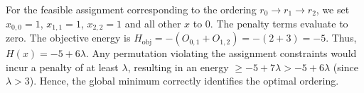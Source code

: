 \documentclass[12pt]{article}
\begin{document}
For the feasible assignment corresponding to the ordering $r_0 \to r_1 \to r_2$, we set $x_{0,0}=1$, $x_{1,1}=1$, $x_{2,2}=1$ and all other $x$ to $0$. The penalty terms evaluate to zero. The objective energy is $H_{\text{obj}} = -(O_{0,1} + O_{1,2}) = -(2 + 3) = -5$. Thus, $H(x) = -5 + 6\lambda$. Any permutation violating the assignment constraints would incur a penalty of at least $\lambda$, resulting in an energy $\ge -5 + 7\lambda > -5 + 6\lambda$ (since $\lambda > 3$). Hence, the global minimum correctly identifies the optimal ordering.
\end{document}
